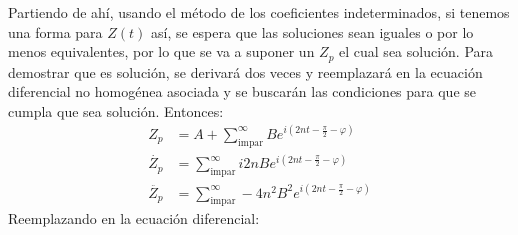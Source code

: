 \begin{multicols}{2}
\begin{itemize}
    Partiendo de ahí, usando el método de los coeficientes indeterminados, si tenemos una forma para $Z(t)$ así, se espera que las soluciones sean iguales o por lo menos equivalentes, por lo que se va a suponer un $Z_p$ el cual sea solución. Para demostrar que es solución, se derivará dos veces y reemplazará en la ecuación diferencial no homogénea asociada y se buscarán las condiciones para que se cumpla que sea solución. Entonces:
    \begin{align*}
        Z_p &= A + \sum_{\mathrm{impar}}^{\infty} B e^{i\left(2nt - \frac{\pi}{2} - \varphi\right)}\\
        \dot{Z_p} &= \sum_{\mathrm{impar}}^{\infty} i2nB e^{i\left(2nt - \frac{\pi}{2} - \varphi\right)}\\
        \ddot{Z_p} &= \sum_{\mathrm{impar}}^{\infty} -4n^{2}B^{2} e^{i\left(2nt - \frac{\pi}{2} - \varphi\right)}
    \end{align*}
    Reemplazando en la ecuación diferencial:
\end{itemize}

\end{multicols}

